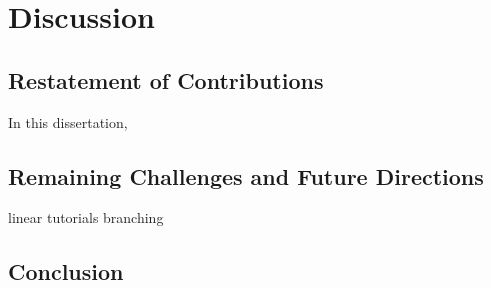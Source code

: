 \chapter{Discussion}
\label{chapter_conclusion}

\section{Restatement of Contributions}
In this dissertation,


\section{Remaining Challenges and Future Directions}
linear tutorials
branching

\section{Conclusion}
